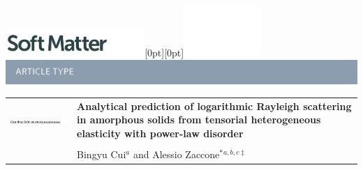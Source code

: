 \documentclass[twoside,twocolumn,9pt]{article}
\begin{document}
  \begin{@twocolumnfalse}
{\includegraphics[height=30pt]{head_foot/SM}\hfill\raisebox{0pt}[0pt][0pt]{\includegraphics[height=55pt]{head_foot/RSC_LOGO_CMYK}}\\[1ex]
\includegraphics[width=18.5cm]{head_foot/header_bar}}\par
\vspace{1em}
\sffamily
\begin{tabular}{m{4.5cm} p{13.5cm} }

\includegraphics{head_foot/DOI} & \noindent\LARGE{\textbf{Analytical prediction of logarithmic Rayleigh scattering in amorphous solids from tensorial heterogeneous elasticity with power-law disorder}} \\%
\vspace{0.3cm} & \vspace{0.3cm} \\

 & \noindent\large{Bingyu Cui\textit{$^{a}$} and Alessio Zaccone$^{\ast}$\textit{$^{a,b,c\ddag}$}} \\%


\end{tabular}
\end{@twocolumnfalse}
\end{document}
